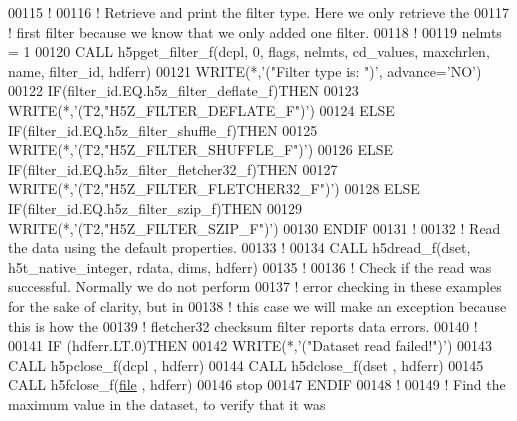 \begin{DoxyCode}
00115   \textcolor{comment}{!}
00116   \textcolor{comment}{! Retrieve and print the filter type.  Here we only retrieve the}
00117   \textcolor{comment}{! first filter because we know that we only added one filter.}
00118   \textcolor{comment}{!}
00119   nelmts = 1
00120   \textcolor{keyword}{CALL }h5pget\_filter\_f(dcpl, 0, flags, nelmts, cd\_values, maxchrlen, name, filter\_id, hdferr)
00121   \textcolor{keyword}{WRITE}(*,\textcolor{stringliteral}{'("Filter type is: ")'}, advance=\textcolor{stringliteral}{'NO'})
00122   \textcolor{keywordflow}{IF}(filter\_id.EQ.h5z\_filter\_deflate\_f)\textcolor{keywordflow}{THEN}
00123      \textcolor{keyword}{WRITE}(*,\textcolor{stringliteral}{'(T2,"H5Z\_FILTER\_DEFLATE\_F")'})
00124   \textcolor{keywordflow}{ELSE} \textcolor{keywordflow}{IF}(filter\_id.EQ.h5z\_filter\_shuffle\_f)\textcolor{keywordflow}{THEN}
00125      \textcolor{keyword}{WRITE}(*,\textcolor{stringliteral}{'(T2,"H5Z\_FILTER\_SHUFFLE\_F")'})
00126   \textcolor{keywordflow}{ELSE} \textcolor{keywordflow}{IF}(filter\_id.EQ.h5z\_filter\_fletcher32\_f)\textcolor{keywordflow}{THEN}
00127      \textcolor{keyword}{WRITE}(*,\textcolor{stringliteral}{'(T2,"H5Z\_FILTER\_FLETCHER32\_F")'})
00128   \textcolor{keywordflow}{ELSE} \textcolor{keywordflow}{IF}(filter\_id.EQ.h5z\_filter\_szip\_f)\textcolor{keywordflow}{THEN}
00129      \textcolor{keyword}{WRITE}(*,\textcolor{stringliteral}{'(T2,"H5Z\_FILTER\_SZIP\_F")'})
00130 \textcolor{keywordflow}{  ENDIF}
00131   \textcolor{comment}{!}
00132   \textcolor{comment}{! Read the data using the default properties.}
00133   \textcolor{comment}{!}
00134   \textcolor{keyword}{CALL }h5dread\_f(dset, h5t\_native\_integer, rdata, dims, hdferr)
00135   \textcolor{comment}{!}
00136   \textcolor{comment}{! Check if the read was successful.  Normally we do not perform}
00137   \textcolor{comment}{! error checking in these examples for the sake of clarity, but in}
00138   \textcolor{comment}{! this case we will make an exception because this is how the}
00139   \textcolor{comment}{! fletcher32 checksum filter reports data errors.}
00140   \textcolor{comment}{!}
00141   \textcolor{keywordflow}{IF} (hdferr.LT.0)\textcolor{keywordflow}{THEN}
00142      \textcolor{keyword}{WRITE}(*,\textcolor{stringliteral}{'("Dataset read failed!")'})
00143      \textcolor{keyword}{CALL }h5pclose\_f(dcpl , hdferr)
00144      \textcolor{keyword}{CALL }h5dclose\_f(dset , hdferr)
00145      \textcolor{keyword}{CALL }h5fclose\_f(\hyperlink{structfile}{file} , hdferr)
00146      stop
00147 \textcolor{keywordflow}{  ENDIF}
00148   \textcolor{comment}{!}
00149   \textcolor{comment}{! Find the maximum value in the dataset, to verify that it was}

\end{DoxyCode}
